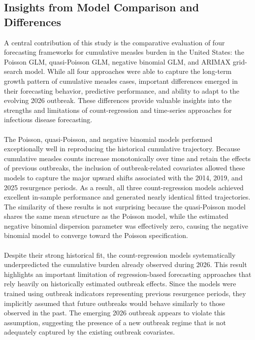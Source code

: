 \documentclass[utf8]{FrontiersinHarvard} %
\begin{document}
\subsection{Insights from Model Comparison and Differences}
A central contribution of this study is the comparative evaluation of four forecasting frameworks for cumulative measles burden in the United States: the Poisson GLM, quasi-Poisson GLM, negative binomial GLM, and ARIMAX grid-search model. While all four approaches were able to capture the long-term growth pattern of cumulative measles cases, important differences emerged in their forecasting behavior, predictive performance, and ability to adapt to the evolving 2026 outbreak. These differences provide valuable insights into the strengths and limitations of count-regression and time-series approaches for infectious disease forecasting.
\\~~\\
The Poisson, quasi-Poisson, and negative binomial models performed exceptionally well in reproducing the historical cumulative trajectory. Because cumulative measles counts increase monotonically over time and retain the effects of previous outbreaks, the inclusion of outbreak-related covariates allowed these models to capture the major upward shifts associated with the 2014, 2019, and 2025 resurgence periods. As a result, all three count-regression models achieved excellent in-sample performance and generated nearly identical fitted trajectories. The similarity of these results is not surprising because the quasi-Poisson model shares the same mean structure as the Poisson model, while the estimated negative binomial dispersion parameter was effectively zero, causing the negative binomial model to converge toward the Poisson specification.
\\~~\\
Despite their strong historical fit, the count-regression models systematically underpredicted the cumulative burden already observed during 2026. This result highlights an important limitation of regression-based forecasting approaches that rely heavily on historically estimated outbreak effects. Since the models were trained using outbreak indicators representing previous resurgence periods, they implicitly assumed that future outbreaks would behave similarly to those observed in the past. The emerging 2026 outbreak appears to violate this assumption, suggesting the presence of a new outbreak regime that is not adequately captured by the existing outbreak covariates.
\\~~\\
\end{document}
